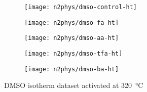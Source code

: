 \begin{figure}[H]
    \centering
    \begin{subfigure}{0.46\linewidth}
        \texttt{[image: n2phys/dmso-control-ht]}%
        \label{appx:def:fig:n2phys-dmso-cont-ht}
    \end{subfigure}%
    \begin{subfigure}{0.46\linewidth}
        \texttt{[image: n2phys/dmso-fa-ht]}%
        \label{appx:def:fig:n2phys-dmso-fa-ht}
    \end{subfigure}%

    
    \begin{subfigure}{0.46\linewidth}
        \texttt{[image: n2phys/dmso-aa-ht]}%
        \label{appx:def:fig:n2phys-dmso-aa-ht}
    \end{subfigure}%
    \begin{subfigure}{0.46\linewidth}
        \texttt{[image: n2phys/dmso-tfa-ht]}%
        \label{appx:def:fig:n2phys-dmso-tfa-ht}
    \end{subfigure}%

    \begin{subfigure}{0.46\linewidth}
        \texttt{[image: n2phys/dmso-ba-ht]}%
        \label{appx:def:fig:n2phys-dmso-ba-ht}
    \end{subfigure}%

    \caption{\gls{DMSO} isotherm dataset activated at \SI{320}{\degreeCelsius}}%
    
\end{figure}